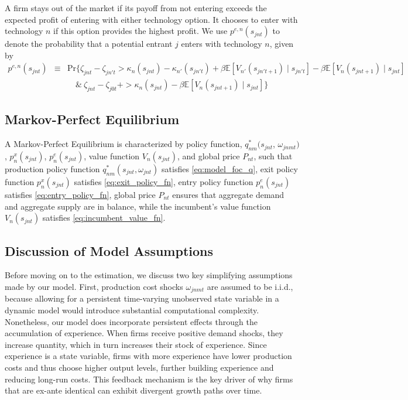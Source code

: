 \documentclass[12pt, letter]{article}
\begin{document}
A firm stays out of the market if its payoff from not entering exceeds the expected profit of entering with either technology option. It chooses to enter with technology $n$ if this option provides the highest profit. We use $p^{e,n}(s_{jnt})$ to denote the probability that a potential entrant $j$ enters with technology $n$, given by
\begin{eqnarray}
  p^{e,n}(s_{jnt}) & \equiv & \text{Pr}\Big\{\zeta_{jnt} - \zeta_{jn't}  > \kappa_n(s_{jnt})-\kappa_{n'}(s_{jn't}) + \beta \mathbb{E}[V_{n'}(s_{jn't+1}) \mid s_{jn't}] - \beta \mathbb{E}[V_n(s_{jnt+1}) \mid s_{jnt}] \nonumber \\
  & & \quad  \& \  \zeta_{jnt}-\zeta_{j0t} + >\kappa_n(s_{jnt})-\beta \mathbb{E}[V_n(s_{jnt+1}) \mid s_{jnt}] \Big\} \label{eq:entry_policy_fn}
\end{eqnarray}

\subsection{Markov-Perfect Equilibrium}
A Markov-Perfect Equilibrium is characterized by policy function, $q^*_{nm}(s_{jnt}$, $\omega_{jnmt})$, $p_n^x(s_{jnt})$, $p_n^e(s_{jnt})$, value function $V_n(s_{jnt})$, and global price $P_{nt}$, such that production policy function $q^*_{nm}(s_{jnt},\omega_{jnt})$ satisfies \eqref{eq:model_foc_q}, exit policy function $p_n^x(s_{jnt})$ satisfies \eqref{eq:exit_policy_fn}, entry policy function $p_n^e(s_{jnt})$ satisfies \eqref{eq:entry_policy_fn}, global price $P_{nt}$ ensures that aggregate demand and aggregate supply are in balance, while the incumbent's value function $V_n(s_{jnt})$ satisfies \eqref{eq:incumbent_value_fn}.

\subsection{Discussion of Model Assumptions}

Before moving on to the estimation, we discuss two key simplifying assumptions made by our model. 
First, production cost shocks $\omega_{jnmt}$ are assumed to be i.i.d., because allowing for a persistent time-varying unobserved state variable in a dynamic model would introduce substantial computational complexity. Nonetheless, our model does incorporate persistent effects through the accumulation of experience. When firms receive positive demand shocks, they increase quantity, which in turn increases their stock of experience.  Since experience is a state variable, firms with more experience have lower production costs and thus choose higher output levels, further building experience and reducing long-run costs. This feedback mechanism is the key driver of why firms that are ex-ante identical can exhibit divergent growth paths over time.
\end{document}
